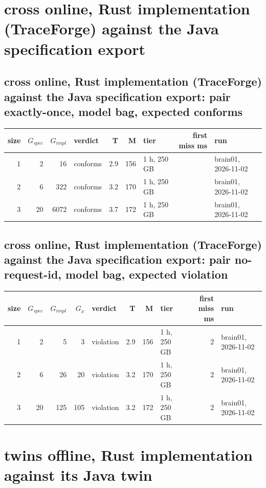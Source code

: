 \documentclass[10pt]{article}
\begin{document}
\section*{cross online, Rust implementation (TraceForge) against the Java specification export}
\subsection*{cross online, Rust implementation (TraceForge) against the Java specification export: pair \textsf{exactly-once}, model bag, expected conforms}
\begin{longtable}{@{}rrrlrrlrl@{}}
\toprule
size & $G_{\mathit{spec}}$ & $G_{\mathit{impl}}$ & verdict & T & M & tier & first miss ms & run \\
\midrule
\endhead
\color{red} 1 & 2 & 16 & conforms & 2.9 & 156 & 1 h, 250 GB &  & brain01, 2026-11-02 \\
\color{red} 2 & 6 & 322 & conforms & 3.2 & 170 & 1 h, 250 GB &  & brain01, 2026-11-02 \\
\color{red} 3 & 20 & 6072 & conforms & 3.7 & 172 & 1 h, 250 GB &  & brain01, 2026-11-02 \\
\bottomrule
\end{longtable}
\subsection*{cross online, Rust implementation (TraceForge) against the Java specification export: pair \textsf{no-request-id}, model bag, expected violation}
\begin{longtable}{@{}rrrrlrrlrl@{}}
\toprule
size & $G_{\mathit{spec}}$ & $G_{\mathit{impl}}$ & $G_x$ & verdict & T & M & tier & first miss ms & run \\
\midrule
\endhead
\color{red} 1 & 2 & 5 & 3 & violation & 2.9 & 156 & 1 h, 250 GB & 2 & brain01, 2026-11-02 \\
\color{red} 2 & 6 & 26 & 20 & violation & 3.2 & 170 & 1 h, 250 GB & 2 & brain01, 2026-11-02 \\
\color{red} 3 & 20 & 125 & 105 & violation & 3.2 & 172 & 1 h, 250 GB & 2 & brain01, 2026-11-02 \\
\bottomrule
\end{longtable}
\section*{twins offline, Rust implementation against its Java twin}
\end{document}
